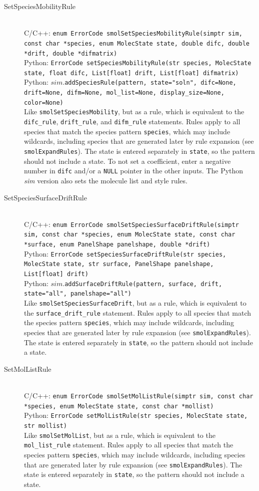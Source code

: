 \documentclass {scrbook}
\newcommand {\ttt} {\texttt}
\begin{document}
\begin{description}
\item[SetSpeciesMobilityRule]
\hfill \\
C/C++: \ttt{enum ErrorCode smolSetSpeciesMobilityRule(simptr sim, const char *species, enum MolecState state, double difc, double *drift, double *difmatrix)}\\
Python: \ttt{ErrorCode setSpeciesMobilityRule(str species, MolecState state, float difc, List[float] drift, List[float] difmatrix)}\\
Python: $sim$.\ttt{addSpeciesRule(pattern, state="soln", difc=None, drift=None, difm=None, mol\_list=None, display\_size=None, color=None)}\\
Like \ttt{smolSetSpeciesMobility}, but as a rule, which is equivalent to the \ttt{difc\_rule}, \ttt{drift\_rule}, and \ttt{difm\_rule} statements. Rules apply to all species that match the species pattern \ttt{species}, which may include wildcards, including species that are generated later by rule expansion (see \ttt{smolExpandRules}). The state is entered separately in \ttt{state}, so the pattern should not include a state. To not set a coefficient, enter a negative number in \ttt{difc} and/or a \ttt{NULL} pointer in the other inputs. The Python \textit{sim} version also sets the molecule list and style rules.

\item[SetSpeciesSurfaceDriftRule]
\hfill \\
C/C++: \ttt{enum ErrorCode smolSetSpeciesSurfaceDriftRule(simptr sim, const char *species, enum MolecState state, const char *surface, enum PanelShape panelshape, double *drift)}\\
Python: \ttt{ErrorCode setSpeciesSurfaceDriftRule(str species, MolecState state, str surface, PanelShape panelshape, List[float] drift)}\\
Python: $sim$.\ttt{addSurfaceDriftRule(pattern, surface, drift, state="all", panelshape="all")}\\
Like \ttt{smolSetSpeciesSurfaceDrift}, but as a rule, which is equivalent to the \ttt{surface\_drift\_rule} statement. Rules apply to all species that match the species pattern \ttt{species}, which may include wildcards, including species that are generated later by rule expansion (see \ttt{smolExpandRules}). The state is entered separately in \ttt{state}, so the pattern should not include a state. 

\item[SetMolListRule]
\hfill \\
C/C++: \ttt{enum ErrorCode smolSetMolListRule(simptr sim, const char *species, enum MolecState state, const char *mollist)}\\
Python: \ttt{ErrorCode setMolListRule(str species, MolecState state, str mollist)}\\
Like \ttt{smolSetMolList}, but as a rule, which is equivalent to the \ttt{mol\_list\_rule} statement. Rules apply to all species that match the species pattern \ttt{species}, which may include wildcards, including species that are generated later by rule expansion (see \ttt{smolExpandRules}). The state is entered separately in \ttt{state}, so the pattern should not include a state. 


\end{description}
\end{document}
